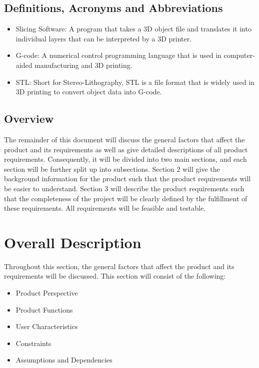 \documentclass[letterpaper, onecolumn, draftclsnofoot, 10pt, compsoc]{IEEEtran}
\begin{document}
\subsection{Definitions, Acronyms and Abbreviations} %
  \begin{itemize}
  	\item Slicing Software: A program that takes a 3D object file and translates it into individual layers that can be interpreted by a 3D printer.
    \item G-code: A numerical control programming language that is used in computer-aided manufacturing and 3D printing.
    \item STL: Short for Stereo-Lithography, STL is a file format that is widely used in 3D printing to convert object data into G-code.
  \end{itemize}

\subsection{Overview} %
The remainder of this document will discuss the general factors that affect the product and its requirements as well as give detailed descriptions of all product requirements. 
Consequently, it will be divided into two main sections, and each section will be further split up into subsections.
Section 2 will give the background information for the product such that the product requirements will be easier to understand.
Section 3 will describe the product requirements such that the completeness of the project will be clearly defined by the fulfillment of these requirements.
All requirements will be feasible and testable.

\section{Overall Description}
Throughout this section, the general factors that affect the product and its requirements will be discussed. 
This section will consist of the following:
\begin{itemize}
	\item Product Perspective
    \item Product Functions
    \item User Characteristics
    \item Constraints
    \item Assumptions and Dependencies
\end{itemize}
\end{document}
